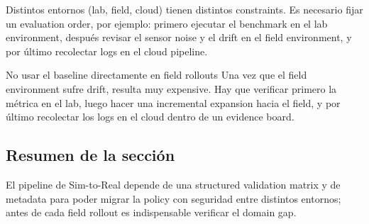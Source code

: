 Distintos entornos (lab, field, cloud) tienen distintos constraints. Es necesario fijar un evaluation order, por ejemplo: primero ejecutar el benchmark en el lab environment, después revisar el sensor noise y el drift en el field environment, y por último recolectar logs en el cloud pipeline.

\begin{warningbox}{No usar el baseline directamente en field rollouts}
Una vez que el field environment sufre drift, resulta muy expensive. Hay que verificar primero la métrica en el lab, luego hacer una incremental expansion hacia el field, y por último recolectar los logs en el cloud dentro de un evidence board.
\end{warningbox}

\subsection{Resumen de la sección}

El pipeline de Sim-to-Real depende de una structured validation matrix y de metadata para poder migrar la policy con seguridad entre distintos entornos; antes de cada field rollout es indispensable verificar el domain gap.
